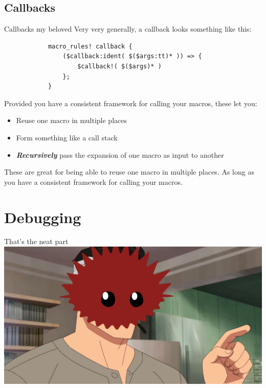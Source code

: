 \documentclass{beamer}
\begin{document}
	\subsection{Callbacks}
	\begin{frame}[fragile]{Callbacks my beloved}
		Very very generally, a callback looks something like this:

		\begin{verbatim}
			macro_rules! callback {
				($callback:ident( $($args:tt)* )) => {
					$callback!( $($args)* )
				};
			}
		\end{verbatim}

		\pause

		Provided you have a consistent framework for calling your macros, these let you:
		\begin{itemize}
			\item Reuse one macro in multiple places
			\item Form something like a call stack
			\item \emph{\textbf{Recursively}} pass the expansion of one macro as input to another
		\end{itemize}

		These are great for being able to reuse one macro in multiple places.\pause{} As long as
		you have a consistent framework for calling your macros.
	\end{frame}

	\section{Debugging}
	\begin{frame}{That's the neat part}
		\includegraphics[width = \linewidth]{neat-part.png}
	\end{frame}
\end{document}

